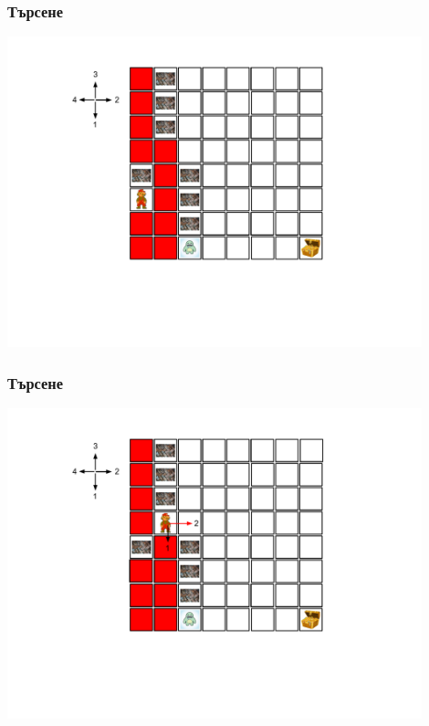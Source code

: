 \documentclass{beamer}
\begin{document}
\begin{frame}[fragile]
\frametitle{Търсене}
\includegraphics[width=12cm]{images/lab_dead1}
\end{frame}



\begin{frame}[fragile]
\frametitle{Търсене}
\includegraphics[width=12cm]{images/lab_choice_01}
\end{frame}
  
\end{document}
